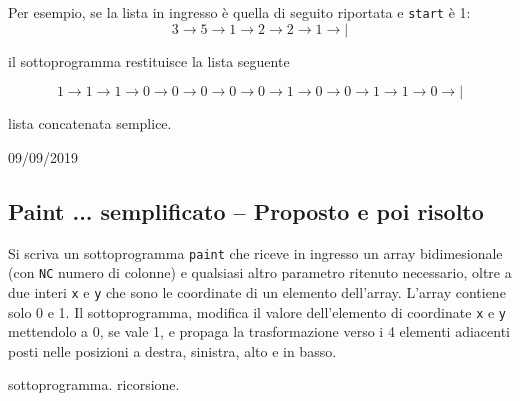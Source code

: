 Per esempio, se la lista in ingresso \`e quella di seguito riportata e \texttt{start} \`e 1:
$$
3 \rightarrow 5 \rightarrow 1 \rightarrow 2  \rightarrow 2 \rightarrow 1 \rightarrow|
$$ 

il sottoprogramma restituisce la lista seguente

$$
1 \rightarrow 1 \rightarrow 1 \rightarrow 0 \rightarrow 0 \rightarrow 0 \rightarrow 0 \rightarrow 0 \rightarrow 1 \rightarrow 0 \rightarrow 0 \rightarrow 1 \rightarrow 1 \rightarrow 0 \rightarrow|
$$ 

\begin{tags}
lista concatenata semplice. 
\end{tags}

\begin{esame}
09/09/2019
\end{esame}



\prosep{}

\subsection{Paint ... semplificato -- Proposto e poi risolto}
Si scriva un sottoprogramma \texttt{paint} che riceve in ingresso un array bidimesionale (con \texttt{NC} numero di colonne) e qualsiasi altro parametro ritenuto necessario, oltre a due interi \texttt{x} e \texttt{y} che sono le coordinate di un elemento dell'array. L'array contiene solo 0 e 1. Il sottoprogramma, modifica il valore dell'elemento di coordinate \texttt{x} e \texttt{y} mettendolo a 0, se vale 1, e propaga la trasformazione verso i 4 elementi adiacenti posti nelle posizioni a destra, sinistra, alto e in basso.

\begin{tags}
sottoprogramma. ricorsione. 
\end{tags}

